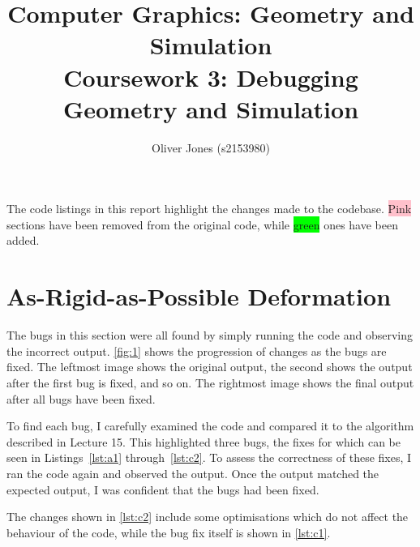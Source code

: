 \documentclass[12pt, a4paper]{article}
\title{Computer Graphics: Geometry and Simulation\\Coursework 3: Debugging Geometry and Simulation}
\author{Oliver Jones (s2153980)}
\date{}
\newcommand{\highlight}[2]{\colorbox{#1}{\vphantom{Ay}#2}}
\newcommand{\removed}[1]{\highlight{pink}{#1}}
\newcommand{\added}[1]{\highlight{lime}{#1}}
\begin{document}
\maketitle

\section*{}
    The code listings in this report highlight the changes made to the codebase.
    \removed{Pink} sections have been removed from the original code, while
    \added{green} ones have been added.

\section{As-Rigid-as-Possible Deformation}
    The bugs in this section were all found by simply running the code and
        observing the incorrect output.
    \autoref{fig:1} shows the progression of changes as the bugs are fixed.
    The leftmost image shows the original output, the second shows the output after
        the first bug is fixed, and so on.
    The rightmost image shows the final output after all bugs have been fixed.

    To find each bug, I carefully examined the code and compared it to the
        algorithm described in Lecture 15.
    This highlighted three bugs, the fixes for which can be seen in
        Listings~\ref{lst:a1} through~\ref{lst:c2}.
    To assess the correctness of these fixes, I ran the code again and observed the
        output.
    Once the output matched the expected output, I was confident that the bugs had
        been fixed.

    The changes shown in \autoref{lst:c2} include some optimisations which do not
        affect the behaviour of the code, while the bug fix itself is shown in
        \autoref{lst:c1}.
\end{document}
